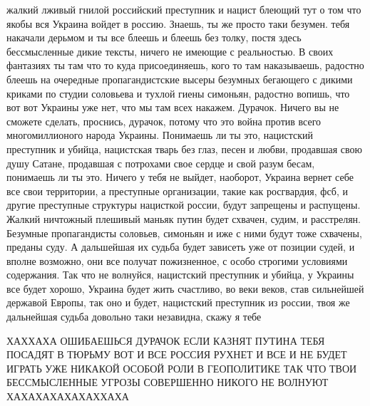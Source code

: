 жалкий лживый гнилой российский преступник и нацист блеющий тут о том что якобы
вся Украина войдет в россию. Знаешь, ты же просто таки безумен. тебя накачали
дерьмом и ты все блеешь и блеешь без толку, постя здесь бессмысленные дикие
тексты, ничего не имеющие с реальностью.  В своих фантазиях ты там что то куда
присоединяешь, кого то там наказываешь, радостно блеешь на очередные
пропагандистские высеры безумных бегающего с дикими криками по студии соловьева
и тухлой гиены симоньян, радостно вопишь, что вот вот Украины уже нет, что мы
там всех накажем.  Дурачок. Ничего вы не сможете сделать, проснись, дурачок,
потому что это война против всего многомиллионого народа Украины. Понимаешь ли
ты это, нацистский преступник и убийца, нацистская тварь без глаз, песен и
любви, продавшая свою душу Сатане, продавшая с потрохами свое сердце и свой
разум бесам, понимаешь ли ты это.  Ничего у тебя не выйдет, наоборот, Украина
вернет себе все свои территории, а преступные организации, такие как
росгвардия, фсб, и другие преступные структуры нацисткой россии, будут
запрещены и распущены. Жалкий ничтожный плешивый маньяк путин будет схвачен,
судим, и расстрелян. Безумные пропагандисты соловьев, симоньян и иже с ними
будут тоже схвачены, преданы суду. А дальшейшая их судьба будет зависеть уже от
позиции судей, и вполне возможно, они все получат пожизненное, с особо строгими
условиями содержания. Так что не волнуйся, нацистский преступник и убийца, у
Украины все будет хорошо, Украина будет жить счастливо, во веки веков, став
сильнейшей державой Европы, так оно и будет, нацистский преступник из россии,
твоя же дальнейшая судьба довольно таки незавидна, скажу я тебе

ХАХХАХА ОШИБАЕШЬСЯ ДУРАЧОК ЕСЛИ КАЗНЯТ ПУТИНА ТЕБЯ ПОСАДЯТ В ТЮРЬМУ ВОТ И ВСЕ
РОССИЯ РУХНЕТ И ВСЕ И НЕ БУДЕТ ИГРАТЬ УЖЕ НИКАКОЙ ОСОБОЙ РОЛИ В ГЕОПОЛИТИКЕ ТАК
ЧТО ТВОИ БЕССМЫСЛЕННЫЕ УГРОЗЫ СОВЕРШЕННО НИКОГО НЕ ВОЛНУЮТ ХАХАХАХАХАХАХХАХА

